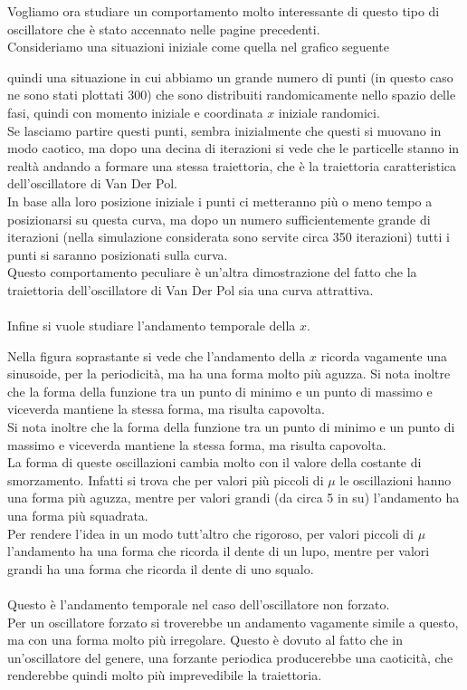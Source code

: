 \documentclass[12pt]{article}
\begin{document}
Vogliamo ora studiare un comportamento molto interessante di questo tipo di oscillatore che è stato accennato nelle pagine precedenti. \\
Consideriamo una situazioni iniziale come quella nel grafico seguente 
\begin{figure}[H]
	\centering
	
\end{figure}
quindi una situazione in cui abbiamo un grande numero di punti (in questo caso ne sono stati plottati 300) che sono distribuiti randomicamente nello spazio delle fasi, quindi con momento iniziale e coordinata $x$ iniziale randomici. \\
Se lasciamo partire questi punti, sembra inizialmente che questi si muovano in modo caotico, ma dopo una decina di iterazioni si vede che le particelle stanno in realtà andando a formare una stessa traiettoria, che è la traiettoria caratteristica dell'oscillatore di Van Der Pol. \\
In base alla loro posizione iniziale i punti ci metteranno più o meno tempo a posizionarsi su questa curva, ma dopo un numero sufficientemente grande di iterazioni (nella simulazione considerata sono servite circa 350 iterazioni) tutti i punti si saranno posizionati sulla curva. \\
Questo comportamento peculiare è un'altra dimostrazione del fatto che la traiettoria dell'oscillatore di Van Der Pol sia una curva attrattiva. \\ \\
Infine si vuole studiare l'andamento temporale della $x$. 
\begin{figure}[H]
	
\end{figure}
Nella figura soprastante si vede che l'andamento della $x$ ricorda vagamente una sinusoide, per la periodicità, ma ha una forma molto più aguzza. Si nota inoltre che la forma della funzione tra un punto di minimo e un punto di massimo e viceverda mantiene la stessa forma, ma risulta capovolta. \\
Si nota inoltre che la forma della funzione tra un punto di minimo e un punto di massimo e viceverda mantiene la stessa forma, ma risulta capovolta. \\
La forma di queste oscillazioni cambia molto con il valore della costante di smorzamento. Infatti si trova che per valori più piccoli di $\mu$ le oscillazioni hanno una forma più aguzza, mentre per valori grandi (da circa 5 in su) l'andamento ha una forma più squadrata. \\
Per rendere l'idea in un modo tutt'altro che rigoroso, per valori piccoli di $\mu$ l'andamento ha una forma che ricorda il dente di un lupo, mentre per valori grandi ha una forma che ricorda il dente di uno squalo. \\ \\ 
Questo è l'andamento temporale nel caso dell'oscillatore non forzato. \\
Per un oscillatore forzato si troverebbe un andamento vagamente simile a questo, ma con una forma molto più irregolare. Questo è dovuto al fatto che in un'oscillatore del genere, una forzante periodica producerebbe una caoticità, che renderebbe quindi molto più imprevedibile la traiettoria.
\end{document}
